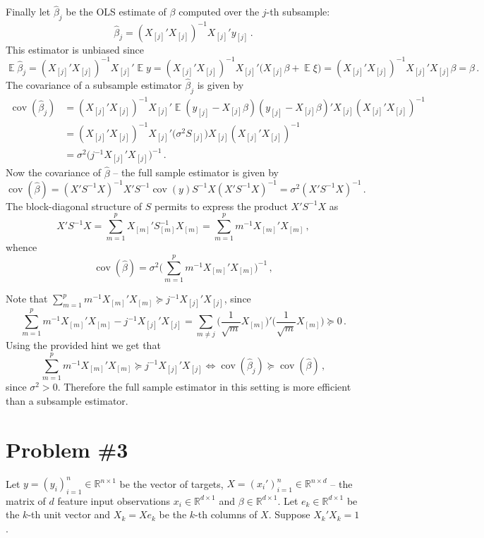 \documentclass[a4paper,12pt]{extarticle}
\newcommand{\cov}{\mathop{\text{cov}}\nolimits}
\newcommand{\ex}{\mathop{\mathbb{E}}\nolimits}
\begin{document}
Finally let $\hat{\beta}_j$ be the OLS estimate of $\beta$ computed over the $j$-th subsample:
$$ \hat{\beta}_j = (X_{[j]}'X_{[j]})^{-1}X_{[j]}'y_{[j]} \,.$$
This estimator is unbiased since
$$\ex \hat{\beta}_j
  = (X_{[j]}'X_{[j]})^{-1}X_{[j]}' \ex y
  = (X_{[j]}'X_{[j]})^{-1}X_{[j]}' \bigl(X_{[j]}\beta + \ex \xi\bigr)
  = (X_{[j]}'X_{[j]})^{-1}X_{[j]}' X_{[j]}\beta
  = \beta
  \,.$$
The covariance of a subsample estimator $\hat{\beta}_j$ is given by
\begin{align*}
  \cov(\hat{\beta}_j)
    &= (X_{[j]}'X_{[j]})^{-1}X_{[j]}'
        \ex(y_{[j]}-X_{[j]}\beta)(y_{[j]}-X_{[j]}\beta)'
      X_{[j]} (X_{[j]}'X_{[j]})^{-1} \\
    &= (X_{[j]}'X_{[j]})^{-1}X_{[j]}' \bigl(\sigma^2 S_{[j]}\bigr) X_{[j]} (X_{[j]}'X_{[j]})^{-1} \\
    &= \sigma^2 \bigl(j^{-1} X_{[j]}' X_{[j]}\bigr)^{-1}
  \,.
\end{align*}
Now the covariance of $\hat{\beta}$ -- the full sample estimator is given by
$$ \cov(\hat{\beta})
  = (X'S^{-1}X)^{-1}X'S^{-1} \cov(y) S^{-1}X(X'S^{-1}X)^{-1}
  = \sigma^2 (X'S^{-1}X)^{-1}
  \,. $$
The block-diagonal structure of $S$ permits to express the product $X'S^{-1}X$ as
$$ X'S^{-1}X = \sum_{m=1}^p X_{[m]}'S^{-1}_{[m]}X_{[m]} = \sum_{m=1}^p m^{-1} X_{[m]}'X_{[m]} \,, $$
whence
$$ \cov(\hat{\beta}) = \sigma^2 \biggl( \sum_{m=1}^p m^{-1} X_{[m]}'X_{[m]} \biggr)^{-1} \,, $$

Note that $\sum_{m=1}^p m^{-1} X_{[m]}'X_{[m]} \succeq j^{-1} X_{[j]}' X_{[j]}$, since
$$ \sum_{m=1}^p m^{-1} X_{[m]}'X_{[m]} - j^{-1} X_{[j]}' X_{[j]}
  = \sum_{m\neq j} \biggl(\frac{1}{\sqrt{m}}X_{[m]}\biggr)' \biggl(\frac{1}{\sqrt{m}}X_{[m]}\biggr) \succeq 0 \,. $$
Using the provided hint we get that
$$ \sum_{m=1}^p m^{-1} X_{[m]}'X_{[m]} \succeq j^{-1} X_{[j]}' X_{[j]}
  \Leftrightarrow \cov(\hat{\beta}_j) \succeq \cov(\hat{\beta})\,,$$
since $\sigma^2 > 0$.
Therefore the full sample estimator in this setting is more efficient than a subsample estimator.


\section{Problem \#3} %
\label{sec:problem_3}

Let $y=(y_i)_{i=1}^n \in \mathbb{R}^{n\times 1}$ be the vector of targets,
$X=(x_i')_{i=1}^n\in \mathbb{R}^{n\times d}$ -- the matrix of $d$ feature input
observations $x_i\in\mathbb{R}^{d\times 1}$ and $\beta \in \mathbb{R}^{d\times 1}$.
Let $e_k \in \mathbb{R}^{d\times 1}$ be the $k$-th unit vector and $X_k = Xe_k$ be
the $k$-th columns of $X$. Suppose $X_k'X_k = 1$.
\end{document}
